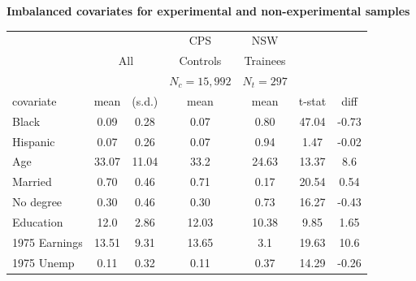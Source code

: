 \documentclass[notes=show]{beamer}
\begin{document}
\begin{frame}[plain,shrink=10]
	\begin{center}
	\textbf{Imbalanced covariates for experimental and non-experimental samples}
	\end{center}

		\begin{center}
		\begin{table}
		\begin{tabular}{lcccccc}
		\hline \hline
		\multicolumn{3}{c}{}&
		\multicolumn{1}{c}{CPS}&
		\multicolumn{1}{c}{NSW}\\
		
		\multicolumn{1}{c}{}&
		\multicolumn{2}{c}{All} &
		\multicolumn{1}{c}{Controls} &
		\multicolumn{1}{c}{Trainees} \\

		\multicolumn{3}{c}{}&
		\multicolumn{1}{c}{$N_c=15,992$}&
		\multicolumn{1}{c}{$N_t=297$}&
		\multicolumn{1}{c}{}&
		\multicolumn{1}{c}{}\\

		\multicolumn{1}{l}{covariate}&
		\multicolumn{1}{c}{mean}&
		\multicolumn{1}{c}{(s.d.)}&
		\multicolumn{1}{c}{mean}&
		\multicolumn{1}{c}{mean}&
		\multicolumn{1}{c}{t-stat}&
		\multicolumn{1}{c}{diff}\\
		\hline
Black    & 0.09 & 0.28 & 0.07 & 0.80 & 47.04 & -0.73\\
Hispanic & 0.07 & 0.26 & 0.07 & 0.94 & 1.47 & -0.02\\
Age & 33.07 & 11.04 & 33.2 & 24.63 & 13.37  & 8.6\\
Married & 0.70 & 0.46 & 0.71 & 0.17 & 20.54 & 0.54\\
No degree & 0.30 & 0.46 & 0.30 & 0.73 & 16.27 & -0.43\\
Education & 12.0 & 2.86 & 12.03 & 10.38 & 9.85 & 1.65 \\
1975 Earnings   & 13.51 & 9.31 & 13.65 & 3.1 & 19.63 & 10.6\\
1975 Unemp  & 0.11 & 0.32 & 0.11 & 0.37 & 14.29 & -0.26\\
		\hline 
		\end{tabular}
		\end{table}
		\end{center}

\end{frame}
\end{document}
